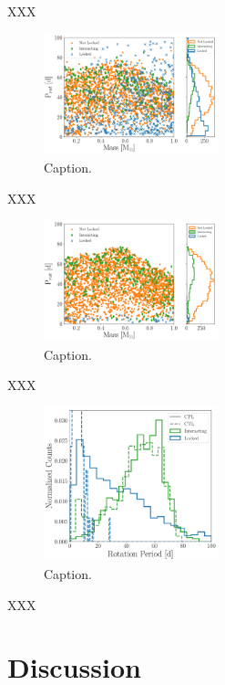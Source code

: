 \documentclass[twocolumn]{aastex61}
\begin{document}
XXX

\begin{figure}
	\includegraphics[width=0.45\textwidth]{../Plots/lockedCPL.pdf}
   \caption{Caption.}%
    \label{fig:lockedCPL}%
\end{figure}

XXX

\begin{figure}
	\includegraphics[width=0.45\textwidth]{../Plots/lockedCTL.pdf}
   \caption{Caption.}%
    \label{fig:lockedCTL}%
\end{figure}

XXX

\begin{figure}
	\includegraphics[width=0.45\textwidth]{../Plots/lockedProtHist.pdf}
   \caption{Caption.}%
    \label{fig:lockedInteracting}%
\end{figure}

XXX

\section{Discussion} \label{sec:discussion}
\end{document}

